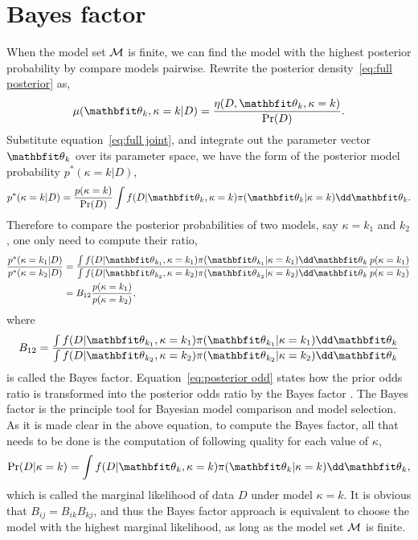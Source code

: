 \section{Bayes factor}
\label{sec:Bayes factor}

When the model set $\mathcal{M}$ is finite, we can find the model with the highest
posterior probability by compare models pairwise. Rewrite the posterior
density~\eqref{eq:full posterior} as,
\begin{equation}
  \mu(\bth_k,\kappa=k|D) = \frac{\eta(D,\bth_k,\kappa=k)}{\Pr(D)}.
\end{equation}
Substitute equation~\eqref{eq:full joint}, and integrate out the parameter
vector $\bth_k$ over its parameter space, we have the form of the posterior
model probability $p^*(\kappa=k|D)$,
\begin{equation}
  p^*(\kappa=k|D) = \frac{p(\kappa = k)}{\Pr(D)}
  \int f(D|\bth_k,\kappa = k)\pi(\bth_k|\kappa = k)\dd\bth_k.
\end{equation}
Therefore to compare the posterior probabilities of two models, say $\kappa =
k_1$ and $k_2$, one only need to compute their ratio,
\begin{align}
  \frac{p^*(\kappa = k_1|D)}{p^*(\kappa = k_2|D)} &= \frac
  {\int f(D|\bth_{k_1},\kappa=k_1)\pi(\bth_{k_1}|\kappa=k_1)\dd\bth_k}
  {\int f(D|\bth_{k_2},\kappa=k_2)\pi(\bth_{k_2}|\kappa=k_2)\dd\bth_k}
  \frac{p(\kappa=k_1)}{p(\kappa=k_2)} \notag\\
  & = B_{12} \frac{p(\kappa=k_1)}{p(\kappa=k_2)},
  \label{eq:posterior odd}
\end{align}
where
\begin{equation}
  B_{12} = \frac
  {\int f(D|\bth_{k_1},\kappa=k_1)\pi(\bth_{k_1}|\kappa=k_1)\dd\bth_k}
  {\int f(D|\bth_{k_2},\kappa=k_2)\pi(\bth_{k_2}|\kappa=k_2)\dd\bth_k}
  \label{eq:bayes factor}
\end{equation}
is called the Bayes factor. Equation~\eqref{eq:posterior odd} states how the
prior odds ratio is transformed into the posterior odds ratio by the Bayes
factor \parencite{Kass1995}. The Bayes factor is the principle tool for
Bayesian model comparison and model selection. As it is made clear in the
above equation, to compute the Bayes factor, all that needs to be done is the
computation of following quality for each value of $\kappa$,
\begin{equation}
  \Pr(D|\kappa = k)
  = \int f(D|\bth_k,\kappa=k)\pi(\bth_k|\kappa=k)\dd\bth_k,
  \label{eq:marginal likelihood}
\end{equation}
which is called the marginal likelihood of data $D$ under model $\kappa = k$.
It is obvious that $B_{ij} = B_{ik} B_{kj}$, and thus the Bayes factor
approach is equivalent to choose the model with the highest marginal
likelihood, as long as the model set $\mathcal{M}$ is finite.

